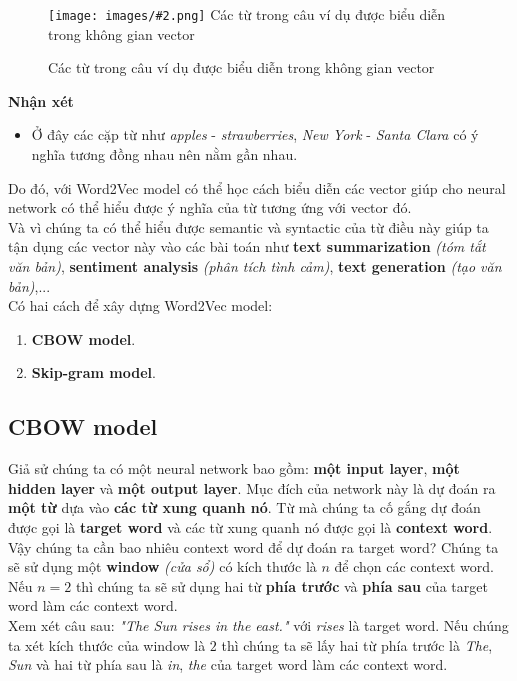 \documentclass[12pt]{article}
\newcommand{\itemsizePaddingLeft}{\setlength{\itemindent}{0.6cm}}
\newcommand{\includeImage}[3]{
\begin{figure}[H]
  \centering
  \texttt{[image: images/\#2.png]}
  \def\temp{#3}\ifx\temp\empty\else\caption{#3}\fi
\end{figure}}
\begin{document}
\includeImage{0.95}{02}{Các từ trong câu ví dụ được biểu diễn trong không gian vector}
\begin{tcolorbox}[grow to left by=-0.6cm]
  \textbf{Nhận xét}
  \begin{itemize}
    \item Ở đây các cặp từ như \textsl{apples} - \textsl{strawberries}, \textsl{New York} - \textsl{Santa Clara} có ý nghĩa tương đồng nhau nên nằm gần nhau.
  \end{itemize}
\end{tcolorbox}

\vskip 0.5cm
\indent Do đó, với Word2Vec model có thể học cách biểu diễn các vector giúp cho neural network có thể hiểu được ý nghĩa của từ tương ứng với vector đó.\\

\indent Và vì chúng ta có thể hiểu được semantic và syntactic của từ điều này giúp ta tận dụng các vector này vào các bài toán như \textbf{text summarization} \textit{(tóm tắt văn bản)}, \textbf{sentiment analysis} \textit{(phân tích tình cảm)}, \textbf{text generation} \textit{(tạo văn bản)},...\\

\indent Có hai cách để xây dựng Word2Vec model:
\begin{enumerate}
  \itemsizePaddingLeft
  \item \textbf{CBOW model}.
  \item \textbf{Skip-gram model}.
\end{enumerate}

\subsection{CBOW model}
Giả sử chúng ta có một neural network bao gồm: \textbf{một input layer}, \textbf{một hidden layer} và \textbf{một output layer}. Mục đích của network này là dự đoán ra \textbf{một từ} dựa vào \textbf{các từ xung quanh nó}. Từ mà chúng ta cố gắng dự đoán được gọi là \textbf{target word} và các từ xung quanh nó được gọi là \textbf{context word}.\\

\indent Vậy chúng ta cần bao nhiêu context word để dự đoán ra target word? Chúng ta sẽ sử dụng một \textbf{window} \textit{(cửa sổ)} có kích thước là $n$ để chọn các context word. Nếu $n = 2$ thì chúng ta sẽ sử dụng hai từ \textbf{phía trước} và \textbf{phía sau} của target word làm các context word.\\

\indent Xem xét câu sau: \textsl{"The Sun rises in the east."} với \textsl{rises} là target word. Nếu chúng ta xét kích thước của window là $2$ thì chúng ta sẽ lấy hai từ phía trước là \textsl{The}, \textsl{Sun} và hai từ phía sau là \textsl{in}, \textsl{the} của target word làm các context word.\\
\end{document}
